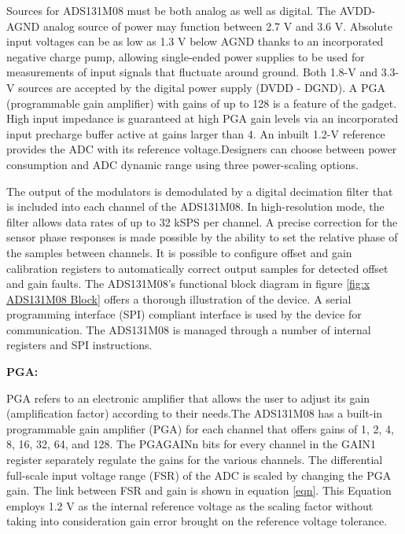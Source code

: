 Sources for ADS131M08 must be both analog as well as digital. The AVDD-AGND analog source of power may function between 2.7 V and 3.6 V. Absolute input voltages can be as low as 1.3 V below AGND thanks to an incorporated negative charge pump, allowing single-ended power supplies to be used for measurements of input signals that fluctuate around ground. Both 1.8-V and 3.3-V sources are accepted by the digital power supply (DVDD - DGND). A PGA (programmable gain amplifier) with gains of up to 128 is a feature of the gadget. High input impedance is guaranteed at high PGA gain levels via an incorporated input precharge buffer active at gains larger than 4. An inbuilt 1.2-V reference provides the ADC with its reference voltage.Designers can choose between power consumption and ADC dynamic range using three power-scaling options. 
\vspace{1\baselineskip}\par 
The output of the modulators is demodulated by a digital decimation filter that is included into each channel of the ADS131M08. In high-resolution mode, the filter allows data rates of up to 32 kSPS per channel. A precise correction for the sensor phase responses is made possible by the ability to set the relative phase of the samples between channels. It is possible to configure offset and gain calibration registers to automatically correct output samples for detected offset and gain faults. The ADS131M08's functional block diagram in figure \ref{fig:x ADS131M08 Block} offers a thorough illustration of the device. A serial programming interface (SPI) compliant interface is used by the device for communication. The ADS131M08 is managed through a number of internal registers and SPI instructions. 
\vspace{1\baselineskip}\par 
\textbf{PGA:}  \par
 PGA refers to an electronic amplifier that allows the user to adjust its gain (amplification factor) according to their needs.The ADS131M08 has a built-in programmable gain amplifier (PGA) for each channel that offers gains of 1, 2, 4, 8, 16, 32, 64, and 128. The PGAGAINn bits for every channel in the GAIN1 register separately regulate the gains for the various channels. The differential full-scale input voltage range (FSR) of the ADC is scaled by changing the PGA gain. The link between FSR and gain is shown in equation \ref{eqn}. This Equation employs 1.2 V as the internal reference voltage as the scaling factor without taking into consideration gain error brought on the reference voltage tolerance.
